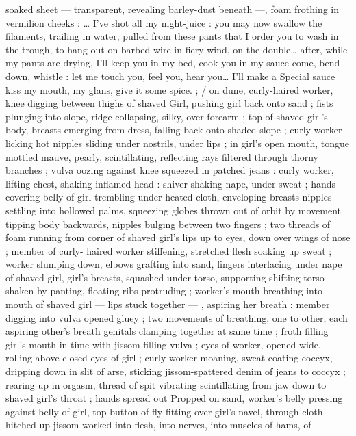 soaked sheet --- transparent, revealing barley-dust beneath ---, 
foam frothing in vermilion cheeks : {\td} {\gl} {\ldots} I've shot all my night-juice 
: you may now swallow the filaments, trailing in water, pulled from 
these pants that I order you to wash in the trough, to hang out on 
barbed wire in fiery wind, on the double{\ldots} after, while my pants are 
drying, I'll keep you in my bed, cook you in my sauce{\td} come, bend 
down, whistle : let me touch you, feel you, hear you{\ldots} I'll make a 
Special sauce{\td} kiss my mouth, my glans, give it some spice.{\gr} ; {\slash} on 
dune, curly-haired worker, knee digging between thighs of shaved 
Girl, pushing girl back onto sand ; fists plunging into slope, ridge 
collapsing, silky, over forearm ; top of shaved girl's body, breasts 
emerging from dress, falling back onto shaded slope ; curly worker 
licking hot nipples sliding under nostrils, under lips ; in girl's open 
mouth, tongue mottled mauve, pearly, scintillating, reflecting rays 
filtered through thorny branches ; vulva oozing against knee 
squeezed in patched jeans : curly worker, lifting chest, shaking 
inflamed head : shiver shaking nape, under sweat ; hands covering 
belly of girl trembling under heated cloth, enveloping breasts 
nipples settling into hollowed palms, squeezing globes thrown out of 
orbit by movement tipping body backwards, nipples bulging between 
two fingers ; two threads of foam running from corner of shaved 
girl's lips up to eyes, down over wings of nose ; member of curly- 
haired worker stiffening, stretched flesh soaking up sweat ; worker 
slumping down, elbows grafting into sand, fingers interlacing under 
nape of shaved girl, girl's breasts, squashed under torso, supporting 
shifting torso shaken by panting, floating ribs protruding ; worker's 
mouth breathing into mouth of shaved girl --- lips stuck together --- 
, aspiring her breath : member digging into vulva opened gluey ; two 
movements of breathing, one to other, each aspiring other's breath 
genitals clamping together at same time ; froth filling girl's mouth in 
time with jissom filling vulva ; eyes of worker, opened wide, rolling 
above closed eyes of girl ; curly worker moaning, sweat coating 
coccyx, dripping down in slit of arse, sticking jissom-spattered denim 
of jeans to coccyx ; rearing up in orgasm, thread of spit vibrating 
scintillating from jaw down to shaved girl's throat ; hands spread out 
Propped on sand, worker's belly pressing against belly of girl, top 
button of fly fitting over girl's navel, through cloth hitched up 
jissom worked into flesh, into nerves, into muscles of hams, of 
